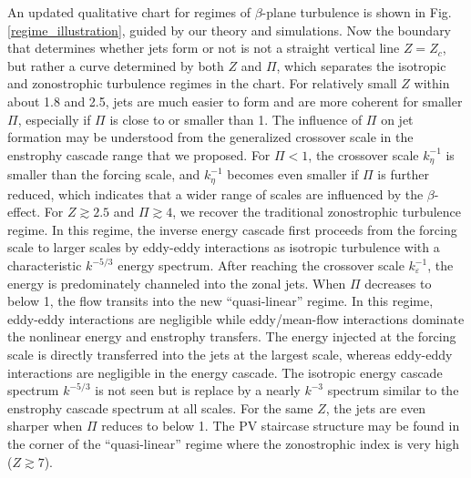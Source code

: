\documentclass{ametsoc}
\begin{document}
An updated qualitative chart for regimes of $\beta$-plane turbulence is shown
in Fig. \ref{regime_illustration}, guided by our theory and simulations.
Now the boundary that determines whether jets form or not is not a
straight vertical line $Z=Z_{c}$, but rather a curve determined by
both $Z$ and $\Pi$, which separates the isotropic and zonostrophic turbulence
regimes in the chart. For relatively small $Z$ within about 1.8 and
2.5, jets are much easier to form and are more coherent for smaller
$\Pi$, especially if $\Pi$ is close to or smaller than 1. The influence
of $\Pi$ on jet formation may be understood from the generalized crossover scale
in the enstrophy cascade range that we proposed. For $\Pi<1$, the
crossover scale $k_{\eta}^{-1}$ is smaller than the forcing scale,
and $k_{\eta}^{-1}$ becomes even smaller if $\Pi$ is further reduced,
which indicates that a wider range of scales are influenced by the $\beta$-effect.
For $Z\apprge2.5$ and $\Pi\apprge 4$, we recover the traditional 
zonostrophic turbulence regime.
In this regime, the inverse energy cascade first proceeds from the
forcing scale to larger scales by eddy-eddy interactions as isotropic
turbulence with a characteristic $k^{-5/3}$ energy spectrum. After
reaching the crossover scale $k_{\varepsilon}^{-1}$, the energy is predominately
channeled into the zonal jets. When $\Pi$ decreases to below 1, the flow transits into
the new ``quasi-linear'' regime. In this regime, eddy-eddy interactions
are negligible while eddy/mean-flow interactions dominate the nonlinear
energy and enstrophy transfers. The energy injected at the forcing
scale is directly transferred into the jets at the largest scale, whereas
eddy-eddy interactions are negligible in the energy cascade. The isotropic
energy cascade spectrum $k^{-5/3}$ is not seen but is replace by
a nearly $k^{-3}$ spectrum similar to the enstrophy cascade spectrum
at all scales. For the same $Z$, the jets are 
even sharper when $\Pi$ reduces to below 1. The PV staircase 
structure may be found in the corner of the ``quasi-linear'' 
regime where the zonostrophic index is very high ($Z\apprge7$).
\end{document}
